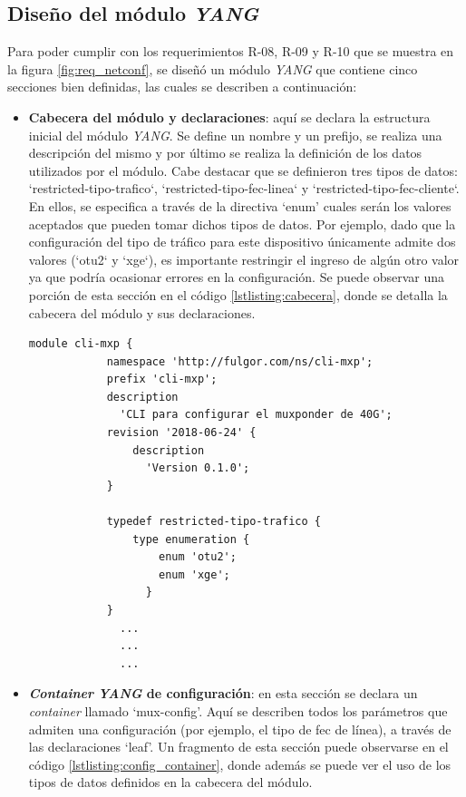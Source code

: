 \subsection{Diseño del módulo \textit{YANG}}

Para poder cumplir con los requerimientos R-08, R-09 y R-10 que se muestra en la figura \ref{fig:req_netconf}, se diseñó un módulo \textit{YANG} que contiene cinco secciones bien definidas, las cuales se describen a continuación: 

\begin{itemize}
	\item \textbf{Cabecera del módulo y declaraciones}: aquí se declara la estructura inicial del módulo \textit{YANG}. Se define un nombre y un prefijo, se realiza una descripción del mismo y por último se realiza la definición de los datos utilizados por el módulo. Cabe destacar que se definieron tres tipos de datos: ‘restricted-tipo-trafico‘, ‘restricted-tipo-fec-linea‘ y ‘restricted-tipo-fec-cliente‘. En ellos, se especifica a través de la directiva ‘enum’ cuales serán los valores aceptados que pueden tomar dichos tipos de datos. Por ejemplo, dado que la configuración del tipo de tráfico para este dispositivo únicamente admite dos valores (‘otu2‘ y ‘xge‘), es importante restringir el ingreso de algún otro valor ya que podría ocasionar errores en la configuración. Se puede observar una porción de esta sección en el código \ref{lstlisting:cabecera}, donde se detalla la cabecera del módulo y sus declaraciones.  

    \begin{lstlisting}[language=SHELXL, caption=Cabecera del módulo \textit{YANG}., label=lstlisting:cabecera]
        module cli-mxp {
            namespace 'http://fulgor.com/ns/cli-mxp';
            prefix 'cli-mxp';
            description
              'CLI para configurar el muxponder de 40G';
            revision '2018-06-24' {
                description
                  'Version 0.1.0';
            }

            typedef restricted-tipo-trafico {
                type enumeration {
                    enum 'otu2';
                    enum 'xge';
                  }
            }
              ...
              ...
              ...

    \end{lstlisting}

    \item \textbf{\textit{Container} \textit{YANG} de configuración}: en esta sección se declara un \textit{container} llamado ‘mux-config’. Aquí se describen todos los parámetros que admiten una configuración (por ejemplo, el tipo de fec de línea), a través de las declaraciones ‘leaf’. Un fragmento de esta sección puede observarse en el código \ref{lstlisting:config_container}, donde además se puede ver el uso de los tipos de datos definidos en la cabecera del módulo.
  

\end{itemize}
